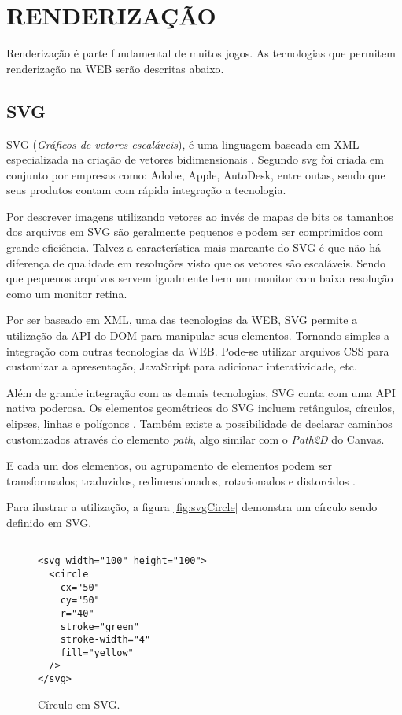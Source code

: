 \section{RENDERIZAÇÃO}
Renderização é parte fundamental de muitos jogos. As tecnologias que
permitem renderização na WEB serão descritas abaixo.
\subsection{SVG}
SVG (\textit{Gráficos de vetores escaláveis}), é uma linguagem
baseada em XML especializada na criação de vetores bidimensionais
\autocite{html5mostwanted}. Segundo \cite[pp. 4]{svgTime} svg foi criada
em conjunto por empresas como: Adobe, Apple, AutoDesk, entre outas,
sendo que seus produtos contam com rápida integração a tecnologia.

Por descrever imagens utilizando vetores ao invés de mapas de bits
os tamanhos dos arquivos em SVG são geralmente pequenos e podem
ser comprimidos com grande eficiência. Talvez a característica mais
marcante do SVG é que não há diferença de qualidade em resoluções
visto que os vetores são escaláveis. Sendo que pequenos arquivos
servem igualmente bem um monitor com baixa resolução como um monitor
retina.

Por ser baseado em XML, uma das tecnologias da WEB, SVG permite a
utilização da API do DOM para manipular seus elementos. Tornando
simples a integração com outras tecnologias da WEB. Pode-se utilizar
arquivos CSS para customizar a apresentação, JavaScript para adicionar
interatividade, etc.

Além de grande integração com as demais tecnologias, SVG conta com
uma API nativa poderosa. Os elementos geométricos do SVG incluem
retângulos, círculos, elipses, linhas e polígonos \autocite[pp.
5]{svgTime}. Também existe a possibilidade de declarar caminhos
customizados através do elemento \textit{path}, algo similar com o
\textit{Path2D} do Canvas.

E cada um dos elementos, ou agrupamento de elementos podem ser
transformados; traduzidos, redimensionados, rotacionados e distorcidos
\autocite[pp. 5]{svgTime}.

Para ilustrar a utilização, a figura \ref{fig:svgCircle} demonstra um
círculo sendo definido em SVG.

\begin{figure}[H]
\centering
\begin{verbatim}

<svg width="100" height="100">
  <circle 
    cx="50" 
    cy="50" 
    r="40" 
    stroke="green" 
    stroke-width="4" 
    fill="yellow" 
  />
</svg>

\end{verbatim}
\caption{Círculo em SVG.}
\label{img:svgCircle}
\end{figure}

